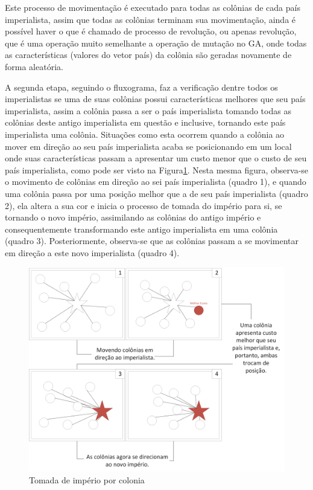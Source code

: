 Este processo de movimentação é executado para todas as colônias de cada país imperialista, assim que todas as colônias terminam sua movimentação, ainda é possível haver o que é chamado de processo de revolução, ou apenas revolução, que é uma operação muito semelhante a operação de mutação no GA, onde todas as características (valores do vetor país) da colônia são geradas novamente de forma aleatória.

A segunda etapa, seguindo o fluxograma, faz a verificação dentre todos os imperialistas se uma de suas colônias possui características melhores que seu país imperialista, assim a colônia passa a ser o país imperialista tomando todas as colônias deste antigo imperialista em questão e inclusive, tornando este país imperialista uma colônia. Situações como esta ocorrem quando a colônia ao mover em direção ao seu país imperialista acaba se posicionando em um local onde suas características passam a apresentar um custo menor que o custo de seu país imperialista, como pode ser visto na Figura\ref{fig:Ilustrations-ColonialRevolution}. Nesta mesma figura, observa-se o movimento de colônias em direção ao sei país imperialista (quadro 1), e quando uma colônia passa por uma posição melhor que a de seu país imperialista (quadro 2), ela altera a sua cor e inicia o processo de tomada do império para si, se tornando o novo império, assimilando as colônias do antigo império e consequentemente transformando este antigo imperialista em uma colônia (quadro 3). Posteriormente, observa-se que as colônias passam a se movimentar em direção a este novo imperialista (quadro 4).

\begin{figure}[h]
	\centering	
	\includegraphics[scale=0.5]{Figuras/Ilustrations-ColonialRevolution.png}
	\caption{Tomada de império por colonia}
	\label{fig:Ilustrations-ColonialRevolution}
\end{figure}

